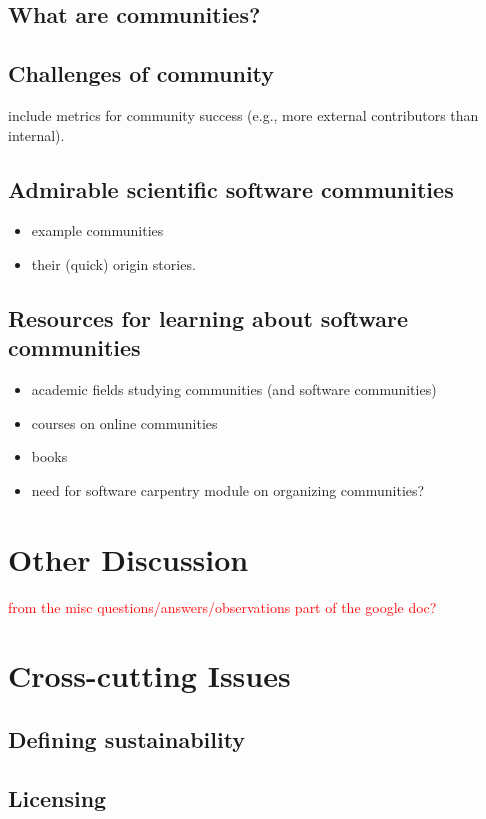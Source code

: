 \documentclass[11pt, oneside]{amsart}
\newcommand{\note}[1]{ {\textcolor{red}    { #1 }}}
\begin{document}
\subsection{What are communities?}
\subsection{Challenges of community}
include metrics for community success (e.g., more external contributors than internal).
\subsection{Admirable scientific software communities}
\begin{itemize}
\item example communities
\item their (quick) origin stories.
\end{itemize}
\subsection{Resources for learning about software communities}
\begin{itemize}
\item academic fields studying communities (and software communities)
\item courses on online communities
\item books
\item need for software carpentry module on organizing communities?
\end{itemize}

\section{Other Discussion}

\note{from the misc questions/answers/observations part of the google doc?}

\section{Cross-cutting Issues}

\subsection{Defining sustainability}

\subsection{Licensing}
\end{document}
